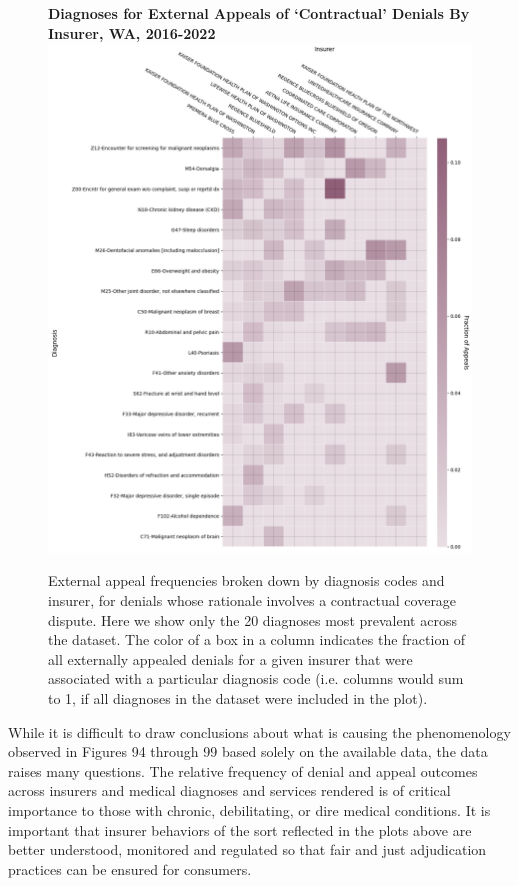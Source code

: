 \documentclass[12pt, a4paper,twoside]{report}
\theoremstyle{plain} %
\theoremstyle{definition} %
\theoremstyle{remark} %
\numberwithin{equation}{chapter}
\begin{document}
		\begin{figure}[h!]
			\centering
			\textbf{Diagnoses for External Appeals of `Contractual' Denials By Insurer, WA, 2016-2022}
			\includegraphics[width=.8\textwidth]{images/wa_external_appeals/contractual_diagnosis_by_insurer.png}
			\caption{External appeal frequencies broken down by diagnosis codes and insurer, for denials whose rationale involves a contractual coverage dispute. Here we show only the 20 diagnoses most prevalent across the dataset. The color of a box in a column indicates the fraction of all externally appealed denials for a given insurer that were associated with a particular diagnosis code (i.e. columns would sum to 1, if all diagnoses in the dataset were included in the plot).}
			\label{wacontractualexternalappealsbydiagnosisinsurer}
		\end{figure}
		
		
		While it is difficult to draw conclusions about what is causing the phenomenology observed in Figures 94 through 99 based solely on the available data, the data raises many questions. The relative frequency of denial and appeal outcomes across insurers and medical diagnoses and services rendered is of critical importance to those with chronic, debilitating, or dire medical conditions. It is important that insurer behaviors of the sort reflected in the plots above are better understood, monitored and regulated so that fair and just adjudication practices can be ensured for consumers.
		
\end{document}
